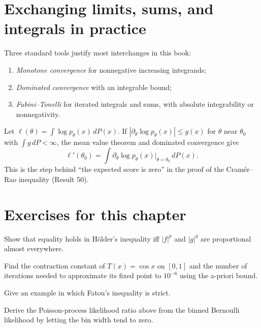 \section{Exchanging limits, sums, and integrals in practice}
Three standard tools justify most interchanges in this book:
\begin{enumerate}[leftmargin=2em]
\item \emph{Monotone convergence} for nonnegative increasing integrands;
\item \emph{Dominated convergence} with an integrable bound;
\item \emph{Fubini--Tonelli} for iterated integrals and sums, with
absolute integrability or nonnegativity.
\end{enumerate}
\begin{example}
Let $\ell(\theta)=\int\log p_\theta(x)\,dP(x)$. If
$|\partial_\theta\log p_\theta(x)|\le g(x)$ for $\theta$ near
$\theta_0$ with $\int g\,dP<\infty$, the mean value theorem and
dominated convergence give
\[
\ell'(\theta_0)=\int\partial_\theta\log p_{\theta}(x)\big|_{\theta=\theta_0}\,dP(x).
\]
This is the step behind ``the expected score is zero'' in the proof
of the Cram\'er--Rao inequality (Result 50).
\end{example}

\section*{Exercises for this chapter}
\begin{exercise}
Show that equality holds in H\"older's inequality iff $|f|^p$ and
$|g|^q$ are proportional almost everywhere.
\end{exercise}
\begin{exercise}
Find the contraction constant of $T(x)=\cos x$ on $[0,1]$ and the
number of iterations needed to approximate its fixed point to $10^{-6}$
using the a-priori bound.
\end{exercise}
\begin{exercise}
Give an example in which Fatou's inequality is strict.
\end{exercise}
\begin{exercise}
Derive the Poisson-process likelihood ratio above from the binned
Bernoulli likelihood by letting the bin width tend to zero.
\end{exercise}
